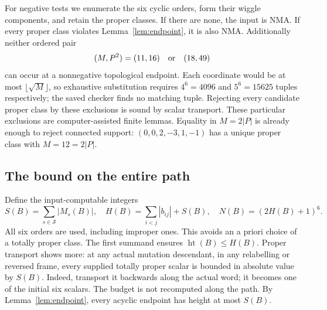 \documentclass[11pt]{amsart}
\theoremstyle{definition}\newtheorem{definition}[theorem]{Definition}
\theoremstyle{remark}\newtheorem{remark}[theorem]{Remark}
\newcommand{\htq}{\operatorname{ht}}\newcommand{\Pf}{\operatorname{Pf}}
\newcommand{\Ssix}{\mathcal S}\newcommand{\mut}[1]{\mu_{[#1]}}
\begin{document}
For negative tests we enumerate the six cyclic orders, form their wiggle components, and retain the proper classes. If there are none, the input is NMA. If every proper class violates Lemma~\ref{lem:endpoint}, it is also NMA. Additionally neither ordered pair
\begin{equation}\label{eq:finiteexclusions}
 (M,P^2)=(11,16)\quad\hbox{or}\quad (18,49)
\end{equation}
can occur at a nonnegative topological endpoint. Each coordinate would be at most $\lfloor\sqrt M\rfloor$, so exhaustive substitution requires $4^6=4096$ and $5^6=15625$ tuples respectively; the saved checker finds no matching tuple. Rejecting every candidate proper class by these exclusions is sound by scalar transport. These particular exclusions are computer-assisted finite lemmas. Equality in $M=2|P|$ is already enough to reject connected support: $(0,0,2,-3,1,-1)$ has a unique proper class with $M=12=2|P|$.

\subsection{The bound on the entire path}\label{sec:height}
Define the input-computable integers
\begin{equation}\label{eq:budget}
 S(B)=\sum_{s\in\Ssix}|M_s(B)|,\quad
 H(B)=\sum_{i<j}|b_{ij}|+S(B),\quad N(B)=(2H(B)+1)^6.
\end{equation}
All six orders are used, including improper ones. This avoids an a priori choice of a totally proper class. The first summand ensures $\htq(B)\le H(B)$. Proper transport shows more: at any actual mutation descendant, in any relabelling or reversed frame, every supplied totally proper scalar is bounded in absolute value by $S(B)$. Indeed, transport it backwards along the actual word; it becomes one of the initial six scalars. The budget is not recomputed along the path. By Lemma~\ref{lem:endpoint}, every acyclic endpoint has height at most $S(B)$.
\end{document}
